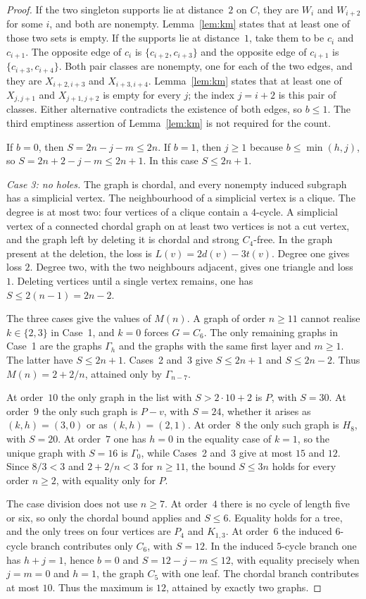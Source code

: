 \documentclass[ASNA]{USG}
\theoremstyle{WBstyletwo}
\numberwithin{equation}{section}
\begin{document}
\begin{proof}
If the two singleton supports lie at distance~$2$ on $C$, they are $W_i$ and $W_{i+2}$ for some $i$, and both are nonempty. Lemma~\ref{lem:km} states that at least one of those two sets is empty. If the supports lie at distance~$1$, take them to be $c_i$ and $c_{i+1}$. The opposite edge of $c_i$ is $\{c_{i+2},c_{i+3}\}$ and the opposite edge of $c_{i+1}$ is $\{c_{i+3},c_{i+4}\}$. Both pair classes are nonempty, one for each of the two edges, and they are $X_{i+2,i+3}$ and $X_{i+3,i+4}$. Lemma~\ref{lem:km} states that at least one of $X_{j,j+1}$ and $X_{j+1,j+2}$ is empty for every $j$; the index $j=i+2$ is this pair of classes. Either alternative contradicts the existence of both edges, so $b\le 1$. The third emptiness assertion of Lemma~\ref{lem:km} is not required for the count.

If $b=0$, then $S=2n-j-m\le 2n$. If $b=1$, then $j\ge 1$ because $b\le\min(h,j)$, so $S=2n+2-j-m\le 2n+1$. In this case $S\le 2n+1$.

\emph{Case 3: no holes.}
The graph is chordal, and every nonempty induced subgraph has a simplicial vertex. The neighbourhood of a simplicial vertex is a clique. The degree is at most two: four vertices of a clique contain a $4$-cycle. A simplicial vertex of a connected chordal graph on at least two vertices is not a cut vertex, and the graph left by deleting it is chordal and strong $C_4$-free. In the graph present at the deletion, the loss is $L(v)=2d(v)-3t(v)$. Degree one gives loss $2$. Degree two, with the two neighbours adjacent, gives one triangle and loss $1$. Deleting vertices until a single vertex remains, one has $S\le 2(n-1)=2n-2$.

The three cases give the values of $M(n)$. A graph of order $n\ge 11$ cannot realise $k\in\{2,3\}$ in Case~1, and $k=0$ forces $G=C_6$. The only remaining graphs in Case~1 are the graphs $\Gamma_h$ and the graphs with the same first layer and $m\ge 1$. The latter have $S\le 2n+1$. Cases~2 and~3 give $S\le 2n+1$ and $S\le 2n-2$. Thus $M(n)=2+2/n$, attained only by $\Gamma_{n-7}$.

At order~$10$ the only graph in the list with $S>2\cdot 10+2$ is $P$, with $S=30$. At order~$9$ the only such graph is $P-v$, with $S=24$, whether it arises as $(k,h)=(3,0)$ or as $(k,h)=(2,1)$. At order~$8$ the only such graph is $H_8$, with $S=20$. At order~$7$ one has $h=0$ in the equality case of $k=1$, so the unique graph with $S=16$ is $\Gamma_0$, while Cases~2 and~3 give at most $15$ and $12$. Since $8/3<3$ and $2+2/n<3$ for $n\ge 11$, the bound $S\le 3n$ holds for every order $n\ge 2$, with equality only for $P$.

The case division does not use $n\ge 7$. At order~$4$ there is no cycle of length five or six, so only the chordal bound applies and $S\le 6$. Equality holds for a tree, and the only trees on four vertices are $P_4$ and $K_{1,3}$. At order~$6$ the induced $6$-cycle branch contributes only $C_6$, with $S=12$. In the induced $5$-cycle branch one has $h+j=1$, hence $b=0$ and $S=12-j-m\le 12$, with equality precisely when $j=m=0$ and $h=1$, the graph $C_5$ with one leaf. The chordal branch contributes at most $10$. Thus the maximum is $12$, attained by exactly two graphs.
\end{proof}
\end{document}
